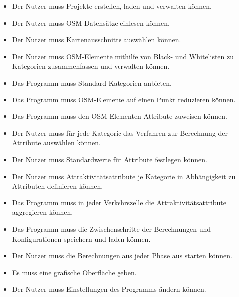 \documentclass[parskip=full]{scrartcl} %
\begin{document}
\begin{itemize}
    \item <MK1> Der Nutzer muss Projekte erstellen, laden und verwalten können.
    \item <MK2> Der Nutzer muss OSM-Datensätze einlesen können.
    \item <MK3> Der Nutzer muss Kartenausschnitte auswählen können.
    \item <MK4> Der Nutzer muss OSM-Elemente mithilfe von Black- und Whitelisten zu Kategorien zusammenfassen und verwalten können.
    \item <MK5> Das Programm muss Standard-Kategorien anbieten.
    \item <MK6> Das Programm muss OSM-Elemente auf einen Punkt reduzieren können.
    \item <MK7> Das Programm muss den OSM-Elementen Attribute zuweisen können.
    \item <MK8> Der Nutzer muss für jede Kategorie das Verfahren zur Berechnung der Attribute auswählen können.
    \item <MK9> Der Nutzer muss Standardwerte für Attribute festlegen können.
    \item <MK10> Der Nutzer muss Attraktivitätsattribute je Kategorie in Abhängigkeit zu Attributen definieren können.
    \item <MK11> Das Programm muss in jeder Verkehrszelle die Attraktivitätsattribute aggregieren können.
    \item <MK12> Das Programm muss die Zwischenschritte der Berechnungen und Konfigurationen speichern und laden können.
    \item <MK13> Der Nutzer muss die Berechnungen aus jeder Phase aus starten können.
    \item <MK14> Es muss eine grafische Oberfläche geben.
    \item <MK15> Der Nutzer muss Einstellungen des Programms ändern können.
\end{itemize}
\end{document}

